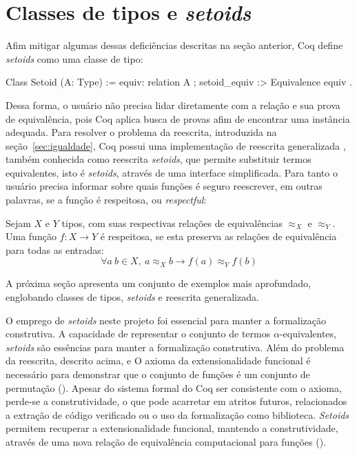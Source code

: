 \section{Classes de tipos e \textit{setoids}}\label{sec:classes-setoids}
Afim mitigar algumas dessas deficiências descritas na seção anterior, Coq define \textit{setoids} como uma classe de tipo:
\begin{coqcode}
Class Setoid (A: Type) := {
   equiv: relation A ;
   setoid_equiv :> Equivalence equiv 
}.
\end{coqcode}
Dessa forma, o usuário não precisa lidar diretamente com a relação e sua prova de equivalência, pois Coq aplica busca de provas afim de encontrar uma instância  adequada. Para resolver o problema da reescrita, introduzida na seção~\ref{sec:igualdade}, Coq possui uma implementação de reescrita generalizada \cite{Sozeau2009}, também conhecida como reescrita \textit{setoids}, que permite substituir termos equivalentes, isto é \textit{setoids}, através de uma interface simplificada. Para tanto o usuário precisa informar sobre quais funções é seguro reescrever, em outras palavras, se a função é respeitosa, ou \textit{respectful}:
\begin{definicao}\label{def:respeitosa}
	Sejam $X$ e $Y$ tipos, com suas respectivas relações de equivalências $\approx_X$ e $\approx_Y$. Uma função $f: X \rightarrow Y$ é respeitosa, se esta preserva as relações de equivalência para todas as entradas:
	\begin{equation*}
		\forall a~b \in X,~a \approx_X b \rightarrow f(a) \approx_Y f(b)
	\end{equation*}
\end{definicao}\noindent
A próxima seção apresenta um conjunto de exemplos mais aprofundado, englobando classes de tipos, \textit{setoids} e reescrita generalizada.


O emprego de \textit{setoids} neste projeto foi essencial para manter a formalização construtiva.
A capacidade de representar o conjunto de termos $\alpha$-equivalentes, \textit{setoids} são essências para manter a formalização construtiva.
Além do problema da reescrita, descrito acima, e  O axioma da extensionalidade funcional é necessário para demonstrar que o conjunto de funções é um conjunto de permutação (). Apesar do sistema formal do Coq ser consistente com o axioma, perde-se a construtividade, o que pode acarretar em atritos futuros, relacionados a extração de código verificado ou o uso da formalização como biblioteca. \textit{Setoids} permitem recuperar a extensionalidade funcional, mantendo a construtividade, através de uma nova relação de equivalência computacional para funções ().

